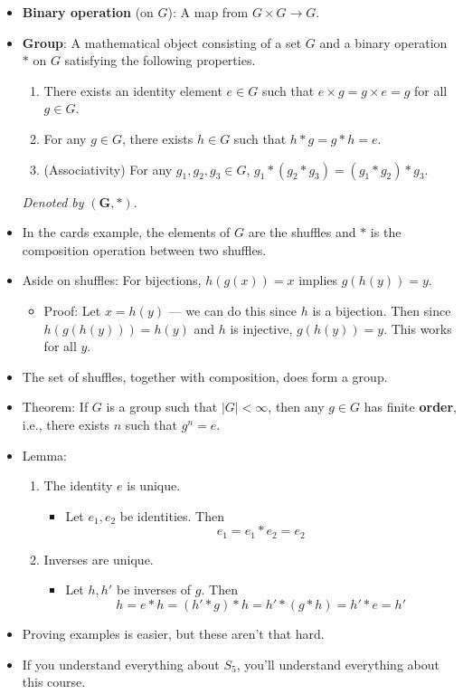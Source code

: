 \documentclass[../notes.tex]{subfiles}
\begin{document}
\begin{itemize}
    \item \textbf{Binary operation} (on $G$): A map from $G\times G\to G$.
    \item \textbf{Group}: A mathematical object consisting of a set $G$ and a binary operation $*$ on $G$ satisfying the following properties.
    \begin{enumerate}
        \item There exists an identity element $e\in G$ such that $e\times g=g\times e=g$ for all $g\in G$.
        \item For any $g\in G$, there exists $h\in G$ such that $h*g=g*h=e$.
        \item (Associativity) For any $g_1,g_2,g_3\in G$, $g_1*(g_2*g_3)=(g_1*g_2)*g_3$.
    \end{enumerate}
    \emph{Denoted by} $\bm{(G,*)}$.
    \item In the cards example, the elements of $G$ are the shuffles and $*$ is the composition operation between two shuffles.
    \item Aside on shuffles: For bijections, $h(g(x))=x$ implies $g(h(y))=y$.
    \begin{itemize}
        \item Proof: Let $x=h(y)$ --- we can do this since $h$ is a bijection. Then since $h(g(h(y)))=h(y)$ and $h$ is injective, $g(h(y))=y$. This works for all $y$.
    \end{itemize}
    \item The set of shuffles, together with composition, does form a group.
    \item Theorem: If $G$ is a group such that $|G|<\infty$, then any $g\in G$ has finite \textbf{order}, i.e., there exists $n$ such that $g^n=e$.
    \item Lemma:
    \begin{enumerate}
        \item The identity $e$ is unique.
        \begin{itemize}
            \item Let $e_1,e_2$ be identities. Then
            \begin{equation*}
                e_1 = e_1*e_2 = e_2
            \end{equation*}
        \end{itemize}
        \item Inverses are unique.
        \begin{itemize}
            \item Let $h,h'$ be inverses of $g$. Then
            \begin{equation*}
                h = e*h
                = (h'*g)*h
                = h'*(g*h)
                = h'*e
                = h'
            \end{equation*}
        \end{itemize}
    \end{enumerate}
    \item Proving examples is easier, but these aren't that hard.
    \item If you understand everything about $S_5$, you'll understand everything about this course.
\end{itemize}
\end{document}

